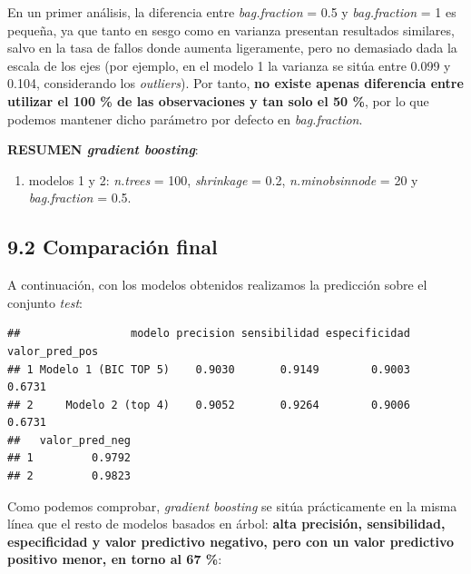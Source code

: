 \documentclass[
]{article}
\providecommand{\tightlist}{%
  \setlength{\itemsep}{0pt}\setlength{\parskip}{0pt}}
\begin{document}
En un primer análisis, la diferencia entre \emph{bag.fraction} = 0.5 y
\emph{bag.fraction} = 1 es pequeña, ya que tanto en sesgo como en
varianza presentan resultados similares, salvo en la tasa de fallos
donde aumenta ligeramente, pero no demasiado dada la escala de los ejes
(por ejemplo, en el modelo 1 la varianza se sitúa entre 0.099 y 0.104,
considerando los \emph{outliers}). Por tanto, \textbf{no existe apenas
diferencia entre utilizar el 100 \% de las observaciones y tan solo el
50 \%}, por lo que podemos mantener dicho parámetro por defecto en
\emph{bag.fraction}.

\textbf{RESUMEN \emph{gradient boosting}}:

\begin{enumerate}
\def\labelenumi{\arabic{enumi}.}
\tightlist
\item
  modelos 1 y 2: \emph{n.trees} = 100, \emph{shrinkage} = 0.2,
  \emph{n.minobsinnode} = 20 y \emph{bag.fraction} = 0.5.
\end{enumerate}

\hypertarget{comparaciuxf3n-final-3}{%
\subsection{9.2 Comparación final}\label{comparaciuxf3n-final-3}}

A continuación, con los modelos obtenidos realizamos la predicción sobre
el conjunto \emph{test}:

\begin{verbatim}
##                 modelo precision sensibilidad especificidad valor_pred_pos
## 1 Modelo 1 (BIC TOP 5)    0.9030       0.9149        0.9003         0.6731
## 2     Modelo 2 (top 4)    0.9052       0.9264        0.9006         0.6731
##   valor_pred_neg
## 1         0.9792
## 2         0.9823
\end{verbatim}

Como podemos comprobar, \emph{gradient boosting} se sitúa prácticamente
en la misma línea que el resto de modelos basados en árbol: \textbf{alta
precisión, sensibilidad, especificidad y valor predictivo negativo, pero
con un valor predictivo positivo menor, en torno al 67 \%}:
\end{document}
